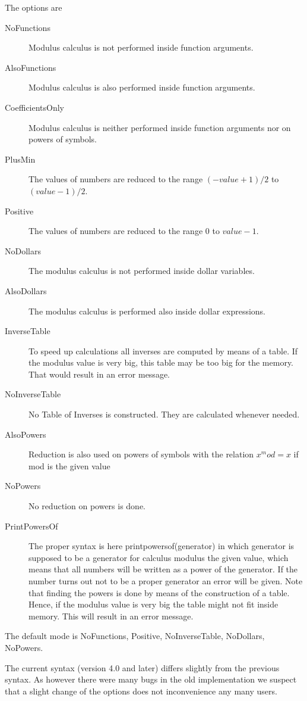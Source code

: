 The options are
\begin{description}
\item[NoFunctions] Modulus calculus is not performed inside function 
arguments.
\item[AlsoFunctions] Modulus calculus is also performed inside function 
arguments.
\item[CoefficientsOnly] Modulus calculus is neither performed inside function 
arguments nor on powers of symbols.
\item[PlusMin] The values of numbers are reduced to the range 
$(-value+1)/2$ to $(value-1)/2$.
\item[Positive] The values of numbers are reduced to the range $0$ to 
$value-1$.
\item[NoDollars] The modulus calculus is not performed inside dollar 
variables.
\item[AlsoDollars] The modulus calculus is performed also inside dollar 
expressions.
\item[InverseTable] To speed up calculations all inverses are computed by 
means of a table. If the modulus value is very big, this table may be too 
big for the memory. That would result in an error message.
\item[NoInverseTable] No Table of Inverses is constructed. They are 
calculated whenever needed.
\item[AlsoPowers] Reduction is also used on powers of symbols with the 
relation $x^mod = x$ if mod is the given value
\item[NoPowers] No reduction on powers is done.
\item[PrintPowersOf] The proper syntax is here printpowersof(generator) in 
which generator is supposed to be a generator for calculus modulus the 
given value, which means that all numbers will be written as a power of the 
generator. If the number turns out not to be a proper generator an error 
will be given. Note that finding the powers is done by means of the 
construction of a table. Hence, if the modulus value is very big the table 
might not fit inside memory. This will result in an error message.
\end{description}
The default mode is NoFunctions, Positive, NoInverseTable, NoDollars, 
NoPowers.

The current syntax (version 4.0 and later) differs slightly from the 
previous syntax. As however there were many bugs in the old implementation 
we suspect that a slight change of the options does not inconvenience any 
many users.

